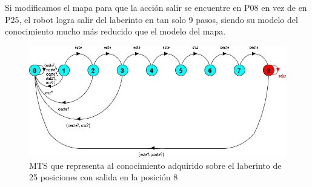 \vspace{\baselineskip}
Si modificamos el mapa para que la acción salir se encuentre en \textcolor[HTML]{0000A0}{P08} en vez de en \textcolor[HTML]{0000A0}{P25},
el robot logra salir del laberinto en tan solo 9 pasos, siendo su modelo del conocimiento mucho más reducido que el modelo del mapa.

\begin{figure}[H]
	\centering
		\includegraphics[width=1.0\textwidth]{Imagenes/Laberintos/25_knowledge_alternativo.jpg}
	\caption{MTS que representa al conocimiento adquirido sobre el laberinto de 25 posiciones con salida en la posición 8}
	\label{fig:25_knowledge_alternativo}
\end{figure}
